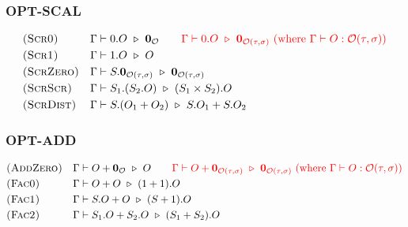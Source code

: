 \subsubsection*{\textsf{OPT-SCAL}}
\begin{align*}
  & \textsc{(Scr0)} && \Gamma \vdash 0.O \reduce \mathbf{0}_\mathcal{O}
  \qquad
  \textcolor{red}{\Gamma \vdash 0.O \reduce \zeroO{\tau, \sigma}\ \textrm{(where $\Gamma \vdash O : \mathcal{O}(\tau, \sigma)$)}} \\
  & \textsc{(Scr1)} && \Gamma \vdash 1.O \reduce O \\
  & \textsc{(ScrZero)} && \Gamma \vdash S.\zeroO{\tau, \sigma} \reduce \zeroO{\tau, \sigma} \\
  & \textsc{(ScrScr)} && \Gamma \vdash S_1.(S_2.O) \reduce (S_1 \times S_2).O \\
  & \textsc{(ScrDist)} && \Gamma \vdash S.(O_1 + O_2) \reduce S.O_1 + S.O_2
\end{align*}

\subsubsection*{\textsf{OPT-ADD}}
\begin{align*}
  & \textsc{(AddZero)} && \Gamma \vdash O + \mathbf{0}_\mathcal{O} \ \triangleright\  O 
  \qquad 
  \textcolor{red}{\Gamma \vdash O + \mathbf{0}_{\mathcal{O}(\tau, \sigma)} \ \triangleright\  \mathbf{0}_{\mathcal{O}(\tau, \sigma)}\ \textrm{(where $\Gamma \vdash O : \mathcal{O}(\tau, \sigma)$)}} \\
  & \textsc{(Fac0)} && \Gamma \vdash O + O \ \triangleright\  (1 + 1).O \\
  & \textsc{(Fac1)} && \Gamma \vdash S.O + O \ \triangleright\  (S + 1).O \\
  & \textsc{(Fac2)} && \Gamma \vdash S_1.O + S_2.O \ \triangleright\  (S_1 + S_2).O
\end{align*}

